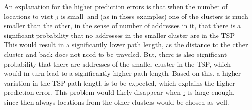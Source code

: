 An explanation for the higher prediction errors is that when the number of locations to visit $j$ is small, and (as in these examples) one of the clusters is much smaller than
the other, in the sense of number of addresses in it, that there is a significant probability that no addresses in the smaller cluster are in the TSP.
This would result in a significantly lower path length, as the distance to the other cluster and back does not need to be traveled. But, there is also
significant probability that there are addresses of the smaller cluster in the TSP, which would in turn lead to a significantly higher path length.
Based on this, a higher variation in the TSP path length is to be expected, which explains the higher prediction error. This problem would likely disappear when
$j$ is large enough, since then always locations from the other clusters would be chosen as well.

